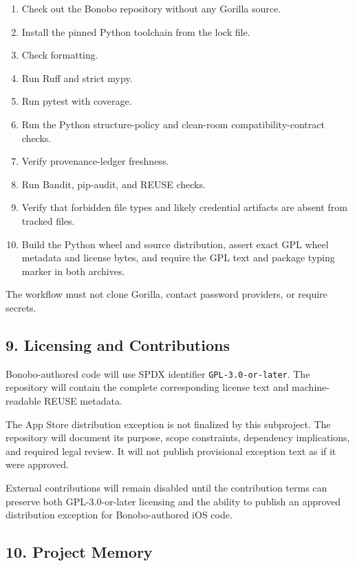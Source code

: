 \documentclass[
  letterpaper,
]{article}
\providecommand{\tightlist}{%
  \setlength{\itemsep}{0pt}\setlength{\parskip}{0pt}}
\begin{document}
\begin{enumerate}
\def\labelenumi{\arabic{enumi}.}
\tightlist
\item
  Check out the Bonobo repository without any Gorilla source.
\item
  Install the pinned Python toolchain from the lock file.
\item
  Check formatting.
\item
  Run Ruff and strict mypy.
\item
  Run pytest with coverage.
\item
  Run the Python structure-policy and clean-room compatibility-contract checks.
\item
  Verify provenance-ledger freshness.
\item
  Run Bandit, pip-audit, and REUSE checks.
\item
  Verify that forbidden file types and likely credential artifacts are absent from tracked files.
\item
  Build the Python wheel and source distribution, assert exact GPL wheel metadata and license bytes, and require the GPL
  text and package typing marker in both archives.
\end{enumerate}

The workflow must not clone Gorilla, contact password providers, or require secrets.

\subsection{9. Licensing and Contributions}\label{9-licensing-and-contributions}

Bonobo-authored code will use SPDX identifier \nolinkurl{GPL-3.0-or-later}. The repository will contain the complete
corresponding license text and machine-readable REUSE metadata.

The App Store distribution exception is not finalized by this subproject. The repository will document its purpose,
scope constraints, dependency implications, and required legal review. It will not publish provisional exception text as
if it were approved.

External contributions will remain disabled until the contribution terms can preserve both GPL-3.0-or-later licensing
and the ability to publish an approved distribution exception for Bonobo-authored iOS code.

\subsection{10. Project Memory}\label{10-project-memory}
\end{document}
